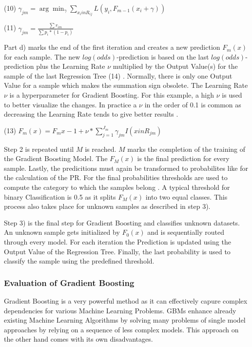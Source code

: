 (10) \(\gamma_{jm} = \arg \min_{\gamma}\sum_{x_{i} in R_{ij}} L(y_{i},F_{m-1}(x_{i} + \gamma)) \)

(11) \(\gamma_{jm} = \frac{ \sum r_{im}}{\sum p_{i} * (1 - p_{i})} \) 

Part d) marks the end of the first iteration and creates a new prediction \(F_{m}(x)\) for each sample. 
The new \(log(odds)\)-prediction is based on the last \(log(odds)\)-prediction plus the Learning Rate \(\nu\) multiplied by 
the Output Value(s) for the sample of the last Regression Tree (14) \cite[p.1203]{Friedman_2001}. Normally, there is only one 
Output Value for a sample which makes the summation sign obsolete. The Learning Rate \(\nu\) is a 
hyperparameter for Gradient Boosting. For this example, a high \(\nu \) is used to better visualize 
the changes. In practice a \(\nu \) in the order of 0.1 is common as decreasing the Learning Rate tends to
give better results \cite[p.1206]{Friedman_2001}. 

(13) \(F_{m}(x) = F_m{x-1} + \nu * \sum_{j = 1}^{J_{m}} \gamma_{jm}I(x in R_{jm}) \)

Step 2 is repeated until \(M\) is reached. \(M\) marks the completion of the training of the Gradient 
Boosting Model. The \(F_{M}(x)\) is the final prediction for every sample. Lastly, the predicitions
must again be transformed to probabilites like for the calculation of the PR. For the final probabilities 
thresholds are used to compute the category to which the samples belong \cite[p.1204]{Friedman_2001}. A typical threshold 
for binary Classification is 0.5 as it splits \(F_{M}(x)\) into two equal classes. This process also 
takes place for unknown samples as described in step 3). 

Step 3) is the final step for Gradient Boosting and classifies unknown datasets. An unknown sample gets 
initialized by \(F_{0}(x)\) and is sequentially routed through every model. For each iteration the 
Prediction is updated using the Output Value of the Regression Tree. Finally, the last probability 
is used to classify the sample using the predefined threshold. 

\subsubsection{Evaluation of Gradient Boosting}

Gradient Boosting is a very powerful method as it can effectively capure complex dependencies for various Machine 
Learning Problems. GBMs enhance already existing Machine Learning Algorithms by solving many problems of single model
approaches by relying on a sequence of less complex models. This approach on the other hand comes with its own disadvantages.

